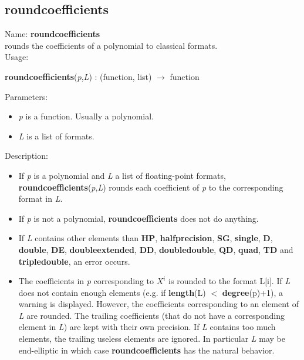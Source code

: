 \subsection{roundcoefficients}
\label{labroundcoefficients}
\noindent Name: \textbf{roundcoefficients}\\
rounds the coefficients of a polynomial to classical formats.\\
\noindent Usage: 
\begin{center}
\textbf{roundcoefficients}(\emph{p},\emph{L}) : (\textsf{function}, \textsf{list}) $\rightarrow$ \textsf{function}\\
\end{center}
Parameters: 
\begin{itemize}
\item \emph{p} is a function. Usually a polynomial.
\item \emph{L} is a list of formats.
\end{itemize}
\noindent Description: \begin{itemize}

\item If \emph{p} is a polynomial and \emph{L} a list of floating-point formats, 
   \textbf{roundcoefficients}(\emph{p},\emph{L}) rounds each coefficient of \emph{p} to the corresponding format
   in \emph{L}.

\item If \emph{p} is not a polynomial, \textbf{roundcoefficients} does not do anything.

\item If \emph{L} contains other elements than \textbf{HP}, \textbf{halfprecision}, \textbf{SG}, \textbf{single}, \textbf{D}, \textbf{double}, 
   \textbf{DE}, \textbf{doubleextended}, \textbf{DD}, \textbf{doubledouble}, \textbf{QD}, \textbf{quad}, \textbf{TD} and \textbf{tripledouble},
   an error occurs.

\item The coefficients in \emph{p} corresponding to $X^i$ is rounded to the 
   format L[i]. If \emph{L} does not contain enough elements
   (e.g. if \textbf{length}(L) $<$ \textbf{degree}(p)+1), a warning is displayed. However, the
   coefficients corresponding to an element of \emph{L} are rounded. The trailing 
   coefficients (that do not have a corresponding element in \emph{L}) are kept with
   their own precision.
   If \emph{L} contains too much elements, the trailing useless elements are ignored.
   In particular \emph{L} may be end-elliptic in which case \textbf{roundcoefficients} has the 
   natural behavior.
\end{itemize}
